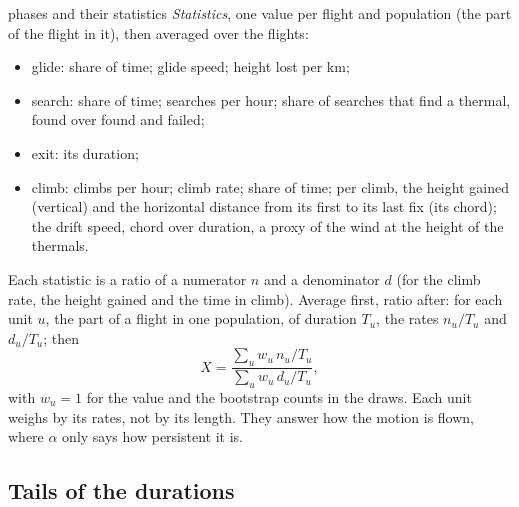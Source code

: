 \documentclass[10pt,a4paper]{article}
\begin{document}
\begin{method}{phases and their statistics}
  \emph{Statistics}, one value per flight and population (the part of the flight in it), then averaged over the
  flights:
  \begin{itemize}
  \item glide: share of time; glide speed; height lost per km;
  \item search: share of time; searches per hour; share of searches that find a thermal, found over found
    and failed;
  \item exit: its duration;
  \item climb: climbs per hour; climb rate; share of time; per climb, the height gained (vertical) and the
    horizontal distance from its first to its last fix (its chord); the drift speed, chord over duration, a proxy
    of the wind at the height of the thermals.
  \end{itemize}
  Each statistic is a ratio of a numerator $n$ and a denominator $d$ (for the climb rate, the height gained and
  the time in climb). Average first, ratio after: for each unit $u$, the part of a flight in one population, of
  duration $T_u$, the rates $n_u/T_u$ and $d_u/T_u$; then
  \[ X=\frac{\sum_u w_u\,n_u/T_u}{\sum_u w_u\,d_u/T_u}, \]
  with $w_u=1$ for the value and the bootstrap counts in the draws. Each unit weighs by its rates, not by its
  length. They answer how the motion is flown, where
  $\alpha$ only says how persistent it is.
\end{method}

\subsection{Tails of the durations}\label{tails}
\end{document}
